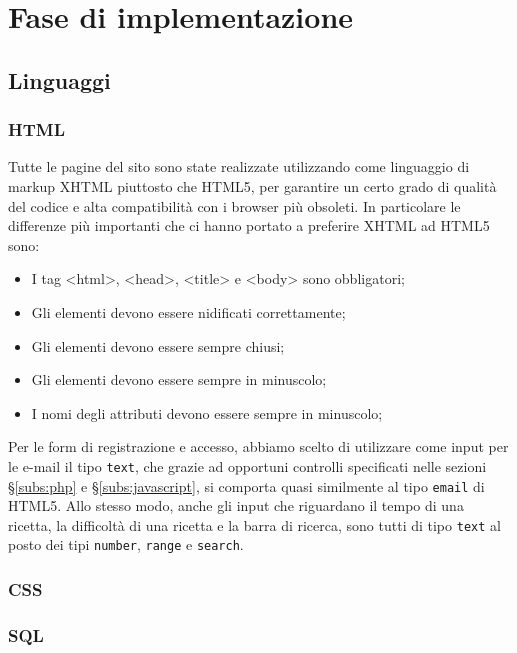 \section{Fase di implementazione}
\label{sec:fase_di_implementazione}
\subsection{Linguaggi}
\subsubsection{HTML}
Tutte le pagine del sito sono state realizzate utilizzando come linguaggio di markup XHTML piuttosto che HTML5, per garantire un certo grado di qualità del codice e alta compatibilità con i browser più obsoleti. In particolare le differenze più importanti che ci hanno portato a preferire XHTML ad HTML5 sono:
\begin{itemize}
	\item I tag <html>, <head>, <title> e <body> sono obbligatori;
	\item Gli elementi devono essere nidificati correttamente;
	\item Gli elementi devono essere sempre chiusi;
	\item Gli elementi devono essere sempre in minuscolo;
	\item I nomi degli attributi devono essere sempre in minuscolo;
\end{itemize}
Per le form di registrazione e accesso, abbiamo scelto di utilizzare come input per le e-mail il tipo \texttt{text}, che grazie ad opportuni controlli specificati nelle sezioni \S\ref{subs:php} e \S\ref{subs:javascript}, si comporta quasi similmente al tipo \texttt{email} di HTML5. Allo stesso modo, anche gli input che riguardano il tempo di una ricetta, la difficoltà di una ricetta e la barra di ricerca, sono tutti di tipo \texttt{text} al posto dei tipi \texttt{number}, \texttt{range} e \texttt{search}. 

\subsubsection{CSS}

\subsubsection{SQL}

